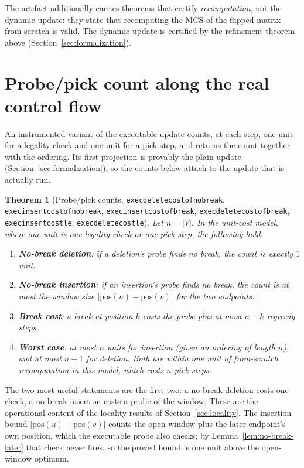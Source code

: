 \documentclass[11pt]{article}
\newtheorem{theorem}{Theorem}
\theoremstyle{definition}
\theoremstyle{remark}
\newcommand{\leanname}[1]{%
  \texttt{\begingroup\def\_{\textunderscore\allowbreak}#1\endgroup}}
\begin{document}
The artifact additionally carries theorems that certify \emph{recomputation},
not the dynamic update: they state that recomputing the MCS of the flipped
matrix from scratch is valid. The dynamic update is certified by the refinement
theorem above (Section~\ref{sec:formalization}).

\section{Probe/pick count along the real control flow}
\label{sec:cost}

An instrumented variant of the executable update counts, at each step, one unit
for a legality check and one unit for a pick step, and returns the count together
with the ordering. Its first projection is provably the plain update
(Section~\ref{sec:formalization}), so the counts below attach to the update that
is actually run.

\begin{theorem}[Probe/pick counts, \leanname{exec\_delete\_cost\_of\_no\_break}, \leanname{exec\_insert\_cost\_of\_no\_break}, \leanname{exec\_insert\_cost\_of\_break}, \leanname{exec\_delete\_cost\_of\_break}, \leanname{exec\_insert\_cost\_le}, \leanname{exec\_delete\_cost\_le}]
\label{thm:cost}
Let $n=|V|$. In the unit-cost model, where one unit is one legality check or
one pick step, the following hold.
\begin{enumerate}
\setlength\itemsep{2pt}
\item \textbf{No-break deletion}: if a deletion's probe finds no break, the
count is \emph{exactly} $1$ unit.

\item \textbf{No-break insertion}: if an insertion's probe finds no break, the
count is at most the window size $|\mathrm{pos}(u)-\mathrm{pos}(v)|$ for the two
endpoints.

\item \textbf{Break cost}: a break at position $k$ costs the probe plus at most
$n-k$ regreedy steps.

\item \textbf{Worst case}: at most $n$ units for insertion (given an ordering of
length $n$), and at most $n+1$ for deletion. Both are within one unit of
from-scratch recomputation in this model, which costs $n$ pick steps.
\end{enumerate}
\end{theorem}

The two most useful statements are the first two: a no-break deletion costs one
check, a no-break insertion costs a probe of the window. These are the
operational content of the locality results of Section~\ref{sec:locality}.
The insertion bound $|\mathrm{pos}(u)-\mathrm{pos}(v)|$ counts the open window
plus the later endpoint's own position, which the executable probe also checks;
by Lemma~\ref{lem:no-break-later} that check never fires, so the proved bound is
one unit above the open-window optimum.
\end{document}
